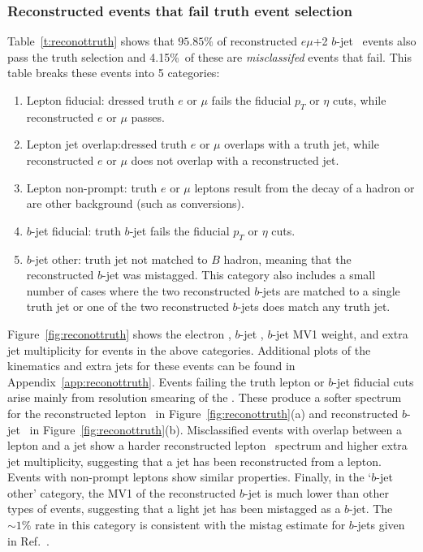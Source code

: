 \subsubsection{Reconstructed events that fail truth event selection}
Table~\ref{t:reconottruth} shows that $95.85\%$ of reconstructed $e\mu$+2 $b$-jet \ttbar\ events also pass the truth selection
and 4.15\%\ of these are \textit{misclassifed} events that fail. 
This table breaks these events into 5 categories:
\begin{enumerate}
\item{Lepton fiducial:} dressed truth $e$ or $\mu$ fails the fiducial $p_{T}$ or $\eta$ cuts, while 
reconstructed $e$ or $\mu$ passes.
\item{Lepton jet overlap:}dressed truth $e$ or $\mu$  overlaps with a truth jet, while reconstructed $e$ or $\mu$ does not overlap with a reconstructed jet.
\item{Lepton non-prompt:} truth $e$ or $\mu$ leptons result from the decay of a hadron or are other background (such as
conversions).
\item{$b$-jet fiducial:} truth $b$-jet fails the fiducial $p_{T}$ or $\eta$ cuts.
\item{$b$-jet other:} truth jet not matched to $B$ hadron, meaning that the reconstructed $b$-jet was mistagged. 
This category also includes a small number of cases where the two reconstructed $b$-jets are matched to a single truth jet or 
one of the two reconstructed $b$-jets does match any truth jet.
\end{enumerate}
Figure~\ref{fig:reconottruth} shows the electron \pt, $b$-jet \pt, $b$-jet MV1 weight, and extra jet multiplicity 
for events in the above categories. Additional plots of the kinematics and extra jets for these events can be found in Appendix~\ref{app:reconottruth}. 
Events failing the truth lepton or $b$-jet fiducial cuts arise mainly from resolution smearing of the \pt.
These produce a softer spectrum 
for the reconstructed lepton \pt\ in Figure~\ref{fig:reconottruth}(a) and reconstructed $b$-jet \pt\ in Figure~\ref{fig:reconottruth}(b). 
Misclassified events with overlap between a lepton and a jet show a harder reconstructed lepton \pt\ spectrum and higher extra jet multiplicity, suggesting that a jet has been reconstructed from a lepton. Events with non-prompt leptons show similar properties. 
Finally, in the `$b$-jet other' category, the MV1 of the reconstructed $b$-jet is much lower than other types of events, 
suggesting that a light jet has been mistagged as a $b$-jet. The $\sim 1\%$ rate in this category is consistent with 
the mistag estimate for $b$-jets given in Ref.~\cite{btagmiscal}.

